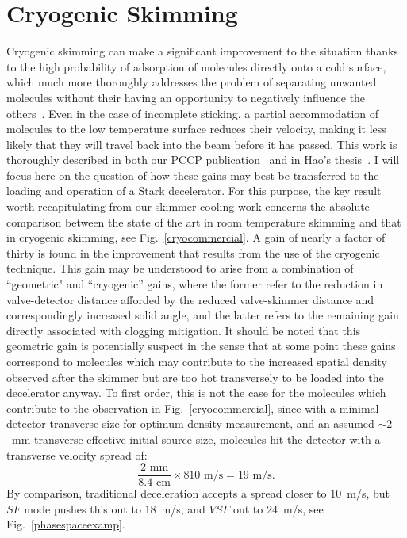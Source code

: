 \section{Cryogenic Skimming}

Cryogenic skimming can make a significant improvement to the situation thanks to the high probability of adsorption of molecules directly onto a cold surface, which much more thoroughly addresses the problem of separating unwanted molecules without their having an opportunity to negatively influence the others~\cite{Segev2017}.
Even in the case of incomplete sticking, a partial accommodation of molecules to the low temperature surface reduces their velocity, making it less likely that they will travel back into the beam before it has passed.
This work is thoroughly described in both our PCCP publication~\cite{Wu2018} and in Hao's thesis~\citep[Chap.~5]{WuThesis2019}.
I will focus here on the question of how these gains may best be transferred to the loading and operation of a Stark decelerator.
For this purpose, the key result worth recapitulating from our skimmer cooling work concerns the absolute comparison between the state of the art in room temperature skimming and that in cryogenic skimming, see Fig.~\ref{cryocommercial}.
A gain of nearly a factor of thirty is found in the improvement that results from the use of the cryogenic technique.
This gain may be understood to arise from a combination of ``geometric" and ``cryogenic'' gains, where the former refer to the reduction in valve-detector distance afforded by the reduced valve-skimmer distance and correspondingly increased solid angle, and the latter refers to the remaining gain directly associated with clogging mitigation.
It should be noted that this geometric gain is potentially suspect in the sense that at some point these gains correspond to molecules which may contribute to the increased spatial density observed after the skimmer but are too hot transversely to be loaded into the decelerator anyway.
To first order, this is not the case for the molecules which contribute to the observation in Fig.~\ref{cryocommercial}, since with a minimal detector transverse size for optimum density measurement, and an assumed $\sim\!2$~mm transverse effective initial source size, molecules hit the detector with a transverse velocity spread of:
\begin{equation}
\frac{2\text{ mm}}{8.4\text{ cm}}\times810\text{ m/s} = 19\text{ m/s}.
\end{equation}
By comparison, traditional deceleration accepts a spread closer to $10$~m/s, but $SF$ mode pushes this out to $18$~m/s, and $VSF$ out to $24$~m/s, see Fig.~\ref{phasespaceexamp}.

